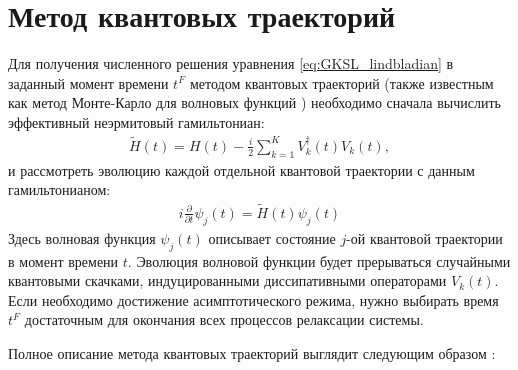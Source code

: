 \section{Метод квантовых траекторий}\label{sec:ch1/sec2}
Для получения численного решения уравнения \cref{eq:GKSL_lindbladian} в заданный момент времени \(t^F\) методом квантовых траекторий (также известным как метод Монте-Карло для волновых функций \cite{Molmer1993}) необходимо сначала вычислить эффективный неэрмитовый гамильтониан:
\begin{equation}
\label{eq:H_nonhermit}
\begin{gathered}
\tilde{H}(t) = H(t) - \frac{i}{2} \sum_{k=1}^{K} V_k^\dagger(t) V_k(t),
\end{gathered}
\end{equation}
и рассмотреть эволюцию каждой отдельной квантовой траектории с данным гамильтонианом:
\begin{equation}
\label{eq:schrodinger}
\begin{gathered}
i \frac{\partial}{\partial t} \psi_j(t) = \tilde{H}(t) \psi_j(t)
\end{gathered}
\end{equation}
Здесь волновая функция \(\psi_j(t)\) описывает состояние \(j\)-ой квантовой траектории в момент времени \(t\). Эволюция волновой функции будет прерываться случайными квантовыми скачками, индуцированными диссипативными операторами \(V_k(t)\). Если необходимо достижение асимптотического режима, нужно выбирать время \(t^F\) достаточным для окончания всех процессов релаксации системы.

Полное описание метода квантовых траекторий выглядит следующим образом \cite{Volokitin2017}:


